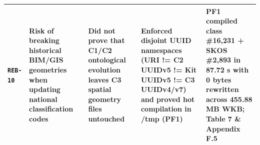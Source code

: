 \documentclass[10pt,a4paper]{article}
\begin{document}
{\begin{longtable}{p{}p{}p{}p{}p{}}
\textbf{\texttt{REB-10}} & Risk of breaking historical BIM/GIS geometries when updating national classification codes & Did not prove that C1/C2 ontological evolution leaves C3 spatial geometry files untouched & Enforced disjoint UUID namespaces (URI != C2 UUIDv5 != Kit UUIDv5 != C3 UUIDv4/v7) and proved hot compilation in /tmp (PF1) & PF1 compiled class \#16,231 + SKOS \#2,893 in 87.72 s with 0 bytes rewritten across 455.88 MB WKB; Table 7 \& Appendix F.5 \\
\bottomrule
\end{longtable}
}
\end{document}
